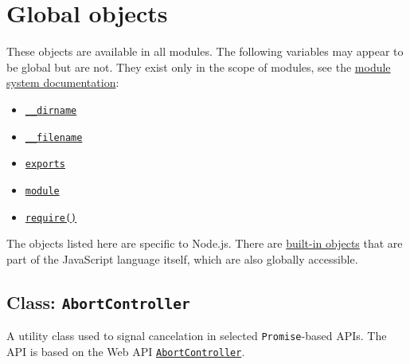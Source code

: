 \section{Global objects}\label{global-objects}

These objects are available in all modules. The following variables may
appear to be global but are not. They exist only in the scope of
modules, see the \href{modules.md}{module system documentation}:

\begin{itemize}
\tightlist
\item
  \href{modules.md\#__dirname}{\texttt{\_\_dirname}}
\item
  \href{modules.md\#__filename}{\texttt{\_\_filename}}
\item
  \href{modules.md\#exports}{\texttt{exports}}
\item
  \href{modules.md\#module}{\texttt{module}}
\item
  \href{modules.md\#requireid}{\texttt{require()}}
\end{itemize}

The objects listed here are specific to Node.js. There are
\href{https://developer.mozilla.org/en-US/docs/Web/JavaScript/Reference/Global_Objects}{built-in
objects} that are part of the JavaScript language itself, which are also
globally accessible.

\subsection{\texorpdfstring{Class:
\texttt{AbortController}}{Class: AbortController}}\label{class-abortcontroller}

A utility class used to signal cancelation in selected
\texttt{Promise}-based APIs. The API is based on the Web API
\href{https://developer.mozilla.org/en-US/docs/Web/API/AbortController}{\texttt{AbortController}}.

\begin{Shaded}
\begin{Highlighting}[]
\OperatorTok{=}  \NormalTok{()}\OperatorTok{;}

\NormalTok{(}\OperatorTok{,}\NormalTok{ () }\KeywordTok{=\textgreater{}} \NormalTok{(}\NormalTok{)}\OperatorTok{,}
\NormalTok{                           \{ }\OperatorTok{:} \NormalTok{ \})}\OperatorTok{;}

\NormalTok{()}\OperatorTok{;}

\NormalTok{)}\OperatorTok{;}  
\end{Highlighting}
\end{Shaded}

